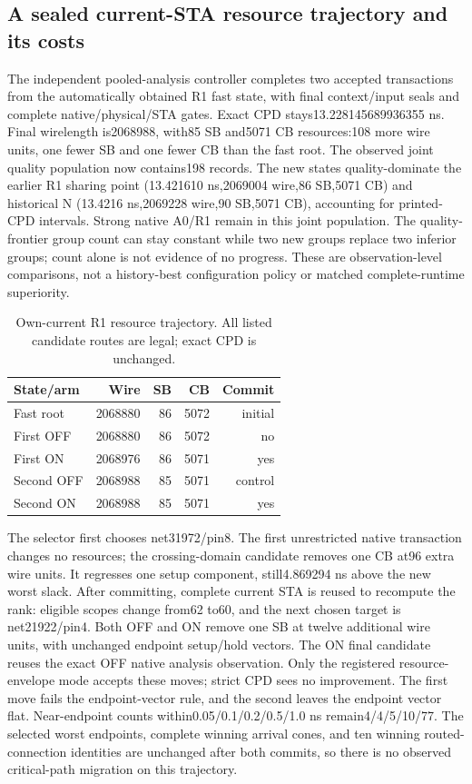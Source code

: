 \subsection{A sealed current-STA resource trajectory and its costs}
The independent pooled-analysis controller completes two accepted transactions from the automatically obtained R1 fast state, with final context/input seals and complete native/physical/STA gates. Exact CPD stays13.228145689936355 ns. Final wirelength is2068988, with85 SB and5071 CB resources:108 more wire units, one fewer SB and one fewer CB than the fast root. The observed joint quality population now contains198 records. The new states quality-dominate the earlier R1 sharing point (13.421610 ns,2069004 wire,86 SB,5071 CB) and historical N (13.4216 ns,2069228 wire,90 SB,5071 CB), accounting for printed-CPD intervals. Strong native A0/R1 remain in this joint population. The quality-frontier group count can stay constant while two new groups replace two inferior groups; count alone is not evidence of no progress. These are observation-level comparisons, not a history-best configuration policy or matched complete-runtime superiority.

\begin{table}[t]
\centering\scriptsize
\caption{Own-current R1 resource trajectory. All listed candidate routes are legal; exact CPD is unchanged.}
\begin{tabular}{lrrrr}
\hline
State/arm & Wire & SB & CB & Commit\\
\hline
Fast root &2068880&86&5072&initial\\
First OFF &2068880&86&5072&no\\
First ON &2068976&86&5071&yes\\
Second OFF &2068988&85&5071&control\\
Second ON &2068988&85&5071&yes\\
\hline
\end{tabular}
\end{table}
The selector first chooses net31972/pin8. The first unrestricted native transaction changes no resources; the crossing-domain candidate removes one CB at96 extra wire units. It regresses one setup component, still4.869294 ns above the new worst slack. After committing, complete current STA is reused to recompute the rank: eligible scopes change from62 to60, and the next chosen target is net21922/pin4. Both OFF and ON remove one SB at twelve additional wire units, with unchanged endpoint setup/hold vectors. The ON final candidate reuses the exact OFF native analysis observation. Only the registered resource-envelope mode accepts these moves; strict CPD sees no improvement. The first move fails the endpoint-vector rule, and the second leaves the endpoint vector flat. Near-endpoint counts within0.05/0.1/0.2/0.5/1.0 ns remain4/4/5/10/77. The selected worst endpoints, complete winning arrival cones, and ten winning routed-connection identities are unchanged after both commits, so there is no observed critical-path migration on this trajectory.

